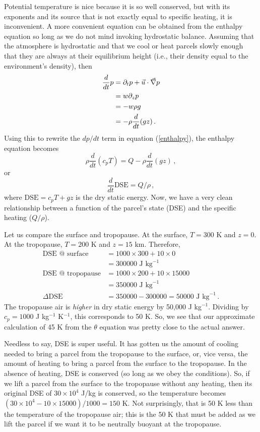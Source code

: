 \documentclass[12pt]{article}
\newcommand{\dse}{{\text{DSE}}}
\begin{document}
Potential temperature is nice because it is so well conserved, but with its exponents and its source that is not exactly equal to specific heating, it is inconvenient.  A more convenient equation can be obtained from the enthalpy equation so long as we do not mind invoking hydrostatic balance.  Assuming that the atmosphere is hydrostatic and that we cool or heat parcels slowly enough that they are always at their equilibrium height (i.e., their density equal to the environment's density), then
\begin{align}
\frac{d}{dt} p &= \partial_t p + \vec{u} \cdot {\vec{\nabla}} p \\
&= w \partial_z p \\
&= -w\rho g \\
&= -\rho \frac{d}{dt} (gz) \, .
\end{align}
Using this to rewrite the $dp/dt$ term in equation (\ref{enthalpy}), the enthalpy equation becomes
\[
\rho \frac{d}{dt} (c_p T) = Q - \rho \frac{d}{dt} (gz) \, ,
\]
or
\begin{equation}
\frac{d}{dt} \dse = Q/\rho \, , \label{dse}
\end{equation}
where $\dse{} = c_p T + gz$ is the dry static energy.  Now, we have a very clean relationship between a function of the parcel's state (DSE) and the specific heating ($Q/\rho$).


Let us compare the surface and tropopause.   At the surface, $T = 300$ K and $z = 0$.  At the tropopause, $T = 200$ K and $z = 15$ km.  Therefore,
\begin{align}
\dse \text{ @ surface} &= 1000 \times 300 + 10 \times 0 \\
&= \num{300000} \text{ J kg}^{-1} \\
\dse \text{ @ tropopause} &= 1000 \times 200 + 10 \times 15000\\
&= \num{350000} \text{ J kg}^{-1} \\
\Delta \dse &= \num{350000}-\num{300000} = \num{50000} \text{ J kg}^{-1} \, .
\end{align}
The tropopause air is {\it higher} in dry static energy by 50,000 J kg$^{-1}$.  Dividing by $c_p = 1000$ J kg$^{-1}$ K$^{-1}$, this corresponds to 50 K.  So, we see that our approximate calculation of 45 K from the $\theta$ equation was pretty close to the actual answer.


Needless to say, DSE is super useful.  It has gotten us the amount of cooling needed to bring a parcel from the tropopause to the surface, or, vice versa, the amount of heating to bring a parcel from the surface to the tropopause.  In the absence of heating, DSE is conserved (so long as we obey the conditions).  So, if we lift a parcel from the surface to the tropopause without any heating, then its original DSE of $30 \times 10^4$ J/kg is conserved, so the temperature becomes $(30 \times 10^4 - 10 \times 15000)/1000 = 150$ K.  Not surprisingly, that is 50 K less than the temperature of the tropopause air; this is the 50 K that must be added as we lift the parcel if we want it to be neutrally buoyant at the tropopause.
\end{document}
